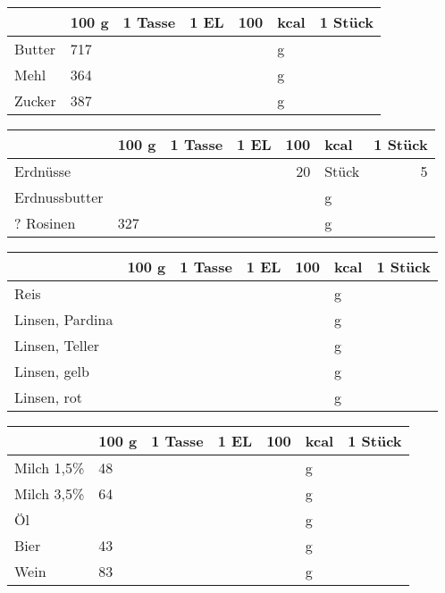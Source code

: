 \begin{tabularx}{\linewidth}{X|l|r|r|rl|r}
                  &   100 g & 1 Tasse & 1 EL &      100 & kcal    & 1 Stück  \\
\hline
Butter            &     717 &         &      &          & g       &          \\
Mehl              &     364 &         &      &          & g       &          \\
Zucker            &     387 &         &      &          & g       &          \\
\end{tabularx}
\begin{tabularx}{\linewidth}{X|l|r|r|rl|r}
                  &   100 g & 1 Tasse & 1 EL &      100 & kcal    & 1 Stück  \\
\hline
Erdnüsse          &         &         &      &       20 & Stück   &       5  \\
Erdnussbutter     &         &         &      &          & g       &          \\
? Rosinen         &     327 &         &      &          & g       &          \\
\end{tabularx}
\begin{tabularx}{\linewidth}{X|l|r|r|rl|r}
                  &   100 g & 1 Tasse & 1 EL &      100 & kcal    & 1 Stück  \\
\hline
Reis              &         &         &      &          & g       &          \\
Linsen, Pardina   &         &         &      &          & g       &          \\
Linsen, Teller    &         &         &      &          & g       &          \\
Linsen, gelb      &         &         &      &          & g       &          \\
Linsen, rot       &         &         &      &          & g       &          \\
\end{tabularx}
\begin{tabularx}{\linewidth}{X|l|r|r|rl|r}
                  &   100 g & 1 Tasse & 1 EL &      100 & kcal    & 1 Stück  \\
\hline
Milch 1,5\%       &      48 &         &      &          & g       &          \\
Milch 3,5\%       &      64 &         &      &          & g       &          \\
Öl                &         &         &      &          & g       &          \\
Bier              &      43 &         &      &          & g       &          \\
Wein              &      83 &         &      &          & g       &          \\
\end{tabularx}
